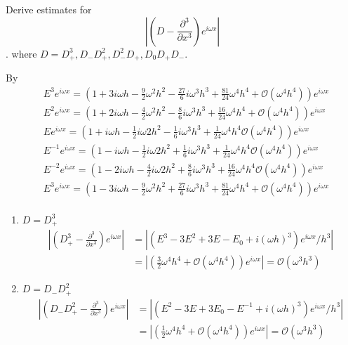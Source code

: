 \exc Derive estimates for 
 \[ \left| \left( D - \frac{\partial^3}{\partial x^3}\right)
 e^{i\omega x}  \right| \].
 where $ D = D^3_+, D_-D_+^2, D_-^2 D_+, D_0D_+D_-$.

 \begin{solution}
    By 
\begin{align*}
    &E^3 e^{i\omega x} = (1 + 3i\omega h - \frac{9}{2}\omega^2h^2 - 
    \frac{27}{6}i \omega^3h^3 + \frac{81}{24} \omega^4h^4 +
     \mathcal{O}(\omega^4 h^4)) e^{i\omega x} \\
    &E^2 e^{i\omega x} = (1 + 2i\omega h - \frac{4}{2}\omega^2h^2 - 
    \frac{8}{6}i \omega^3h^3 + \frac{16}{24} \omega^4h^4 +
     \mathcal{O}(\omega^4 h^4))  e^{i\omega x} \\
    &E e^{i\omega x} = (1 + i\omega h - \frac{1}{2}i\omega2h^2 - 
    \frac{1}{6}i \omega^3h^3 + \frac{1}{24} \omega^4h^4 
     \mathcal{O}(\omega^4 h^4))  e^{i\omega x} \\
    &E^{-1} e^{i\omega x} = (1 - i\omega h - \frac{1}{2}i\omega2h^2 + 
     \frac{1}{6}i \omega^3h^3 + \frac{1}{24} \omega^4h^4 
      \mathcal{O}(\omega^4 h^4))  e^{i\omega x} \\
    &E^{-2} e^{i\omega x} = (1 - 2i\omega h - \frac{4}{2}i\omega2h^2 + 
     \frac{8}{6}i \omega^3h^3 + \frac{16}{24} \omega^4h^4 
      \mathcal{O}(\omega^4 h^4))  e^{i\omega x} \\
    &E^3 e^{i\omega x} = (1 - 3i\omega h - \frac{9}{2}\omega^2h^2 + 
      \frac{27}{6}i \omega^3h^3 + \frac{81}{24} \omega^4h^4 +
       \mathcal{O}(\omega^4 h^4)) e^{i\omega x} \\
\end{align*}
\begin{enumerate}
    \item $D = D_+^3$ 
        \begin{align*}
            \left| \left( D_+^3 - \frac{\partial^3}{\partial x^3}\right)
            e^{i\omega x}  \right| &= 
            \left| \left( E^3 - 3E^2 + 3E - E_0 + i (\omega h)^3 \right)
            e^{i\omega x} / h^3  \right| \\
            &=\left| (\frac{3}{2} \omega^4 h^4 +
             \mathcal{O} (\omega^4 h^4) )  e^{i\omega x} \right| 
             =  \mathcal{O} (\omega^3 h^3)
        \end{align*}

        \item $D = D_- D_+^2$ 
        \begin{align*}
            \left| \left(D_- D_+^2 - \frac{\partial^3}{\partial x^3}\right)
            e^{i\omega x}  \right| &= 
            \left| \left( E^2 - 3E + 3E_0 - E^{-1} + i (\omega h)^3 \right)
            e^{i\omega x} / h^3  \right| \\
            &=\left| (\frac{1}{2} \omega^4 h^4 +
             \mathcal{O} (\omega^4 h^4) )  e^{i\omega x} \right|
             =  \mathcal{O} (\omega^3 h^3)
        \end{align*}
        

\end{enumerate}
\end{solution}
